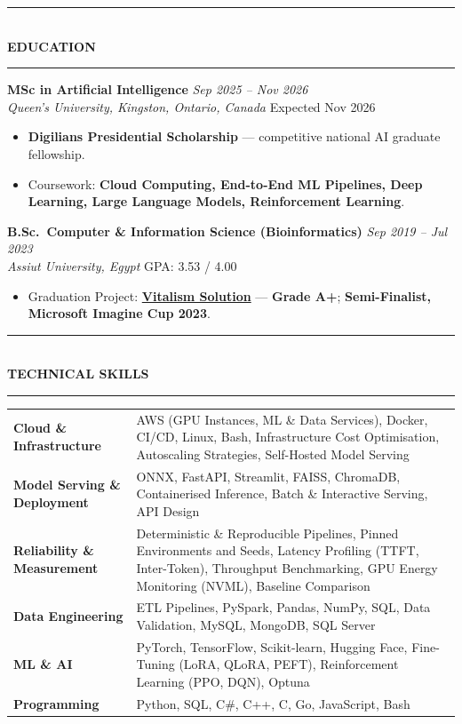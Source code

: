 \documentclass[10pt, a4paper]{article}
\newcommand{\cvsection}[1]{%
  \vspace{3pt}%
  {\color{navy}\rule{\linewidth}{1.1pt}}\\[0.5pt]%
  {\color{navy}\bfseries\fontsize{9.5}{11}\selectfont\uppercase{#1}}\\[-4pt]%
  {\color{teal}\rule{\linewidth}{0.6pt}}%
  \vspace{2pt}%
}
\newcommand{\cventry}[4]{%
  \vspace{2.5pt}%
  \textbf{\color{darkgray}#1} \hfill {\color{midgray}\textit{#3}}\\[-1.5pt]%
  {\color{teal}\textit{#2}} \hfill {\color{midgray}#4}%
}
\newenvironment{cvitems}{%
  \begin{itemize}[leftmargin=11pt, itemsep=0.5pt, parsep=0pt, topsep=1pt,
                  label={\textcolor{teal}{$\bullet$}}]
}{%
  \end{itemize}%
}
\begin{document}
\cvsection{Education}

\cventry{MSc in Artificial Intelligence}{Queen's University, Kingston, Ontario, Canada}
        {Sep 2025 -- Nov 2026}{Expected Nov 2026}
\begin{cvitems}
  \item \textbf{Digilians Presidential Scholarship} --- competitive national AI graduate fellowship.
  \item Coursework: \textbf{Cloud Computing, End-to-End ML Pipelines, Deep Learning, Large Language Models, Reinforcement Learning}.
\end{cvitems}

\cventry{B.Sc.\ Computer \& Information Science (Bioinformatics)}{Assiut University, Egypt}
        {Sep 2019 -- Jul 2023}{GPA: 3.53 / 4.00}
\begin{cvitems}
  \item Graduation Project: \href{https://vitalismsolution.github.io/}{\textbf{Vitalism Solution}} --- \textbf{Grade A+}; \textbf{Semi-Finalist, Microsoft Imagine Cup 2023}.
\end{cvitems}

\cvsection{Technical Skills}

\renewcommand{\arraystretch}{1.1}
\begin{tabularx}{\linewidth}{@{}>{\raggedright\hyphenpenalty=10000\arraybackslash}p{35mm} X@{}}
\textbf{Cloud \& Infrastructure} &
AWS (GPU Instances, ML \& Data Services), Docker, CI/CD, Linux, Bash, Infrastructure Cost Optimisation, Autoscaling Strategies, Self-Hosted Model Serving \\

\textbf{Model Serving \& Deployment} &
ONNX, FastAPI, Streamlit, FAISS, ChromaDB, Containerised Inference, Batch \& Interactive Serving, API Design \\

\textbf{Reliability \& Measurement} &
Deterministic \& Reproducible Pipelines, Pinned Environments and Seeds, Latency Profiling (TTFT, Inter-Token), Throughput Benchmarking, GPU Energy Monitoring (NVML), Baseline Comparison \\

\textbf{Data Engineering} &
ETL Pipelines, PySpark, Pandas, NumPy, SQL, Data Validation, MySQL, MongoDB, SQL Server \\

\textbf{ML \& AI} &
PyTorch, TensorFlow, Scikit-learn, Hugging Face, Fine-Tuning (LoRA, QLoRA, PEFT), Reinforcement Learning (PPO, DQN), Optuna \\

\textbf{Programming} &
Python, SQL, C\#, C++, C, Go, JavaScript, Bash \\
\end{tabularx}
\end{document}
